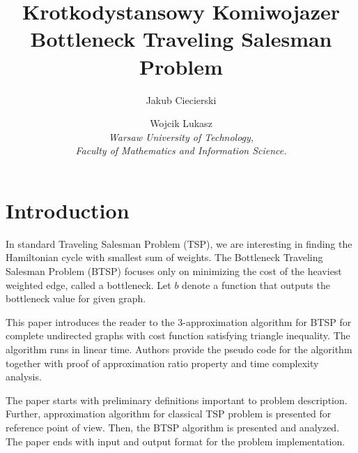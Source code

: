 \documentclass[runningheads, a4paper]{llncs}
\begin{document}
    
\mainmatter  %

\title{Krotkodystansowy Komiwojazer \\ Bottleneck Traveling Salesman Problem}


\author{Jakub Ciecierski \and Wojcik Lukasz \\ 
    \textit{Warsaw University of Technology, \\
        Faculty of Mathematics and Information Science.}}
%


\maketitle
        
        
        
        
        
\section{Introduction}
In standard Traveling Salesman Problem (TSP), we are interesting in finding the Hamiltonian cycle with smallest sum of weights. The Bottleneck Traveling Salesman Problem (BTSP) focuses only on minimizing the cost of the heaviest weighted edge, called a bottleneck. Let $b$ denote a function that outputs the bottleneck value for given graph.

This paper introduces the reader to the 3-approximation algorithm for BTSP for complete undirected graphs with cost function satisfying triangle inequality. The algorithm runs in linear time. Authors provide the pseudo code for the algorithm together with proof of approximation ratio property and time complexity analysis.

The paper starts with preliminary definitions important to problem description. Further, approximation algorithm for classical TSP problem is presented for reference point of view. Then, the BTSP algorithm is presented and analyzed. The paper ends with input and output format for the problem implementation.
\end{document}
